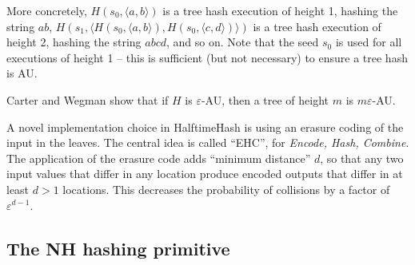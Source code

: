 \documentclass[runningheads]{llncs}
\begin{document}
More concretely, $H(s_0,\langle{}a,b\rangle)$ is a tree hash execution of height 1, hashing the string $ab$, $H(s_1, \langle H(s_0, \langle a,b\rangle), H(s_0, \langle c,d\rangle)\rangle)$ is a tree hash execution of height 2, hashing the string $a b c d$, and so on.
Note that the seed $s_0$ is used for all executions of height 1 -- this is sufficient (but not necessary) to ensure a tree hash is AU.

Carter and Wegman show that if $H$ is $\varepsilon$-AU, then a tree of height $m$ is $m\varepsilon$-AU.

A novel implementation choice in HalftimeHash is using an erasure coding of the input in the leaves.
The central idea is called ``EHC'', for {\em Encode, Hash, Combine}. \cite{ehc-nandi}
The application of the erasure code adds ``minimum distance'' $d$, so that any two input values that differ in any location produce encoded outputs that differ in at least $d > 1$ locations.
This decreases the probability of collisions by a factor of $\varepsilon^{d-1}$.



\subsection{The NH hashing primitive}
\end{document}
